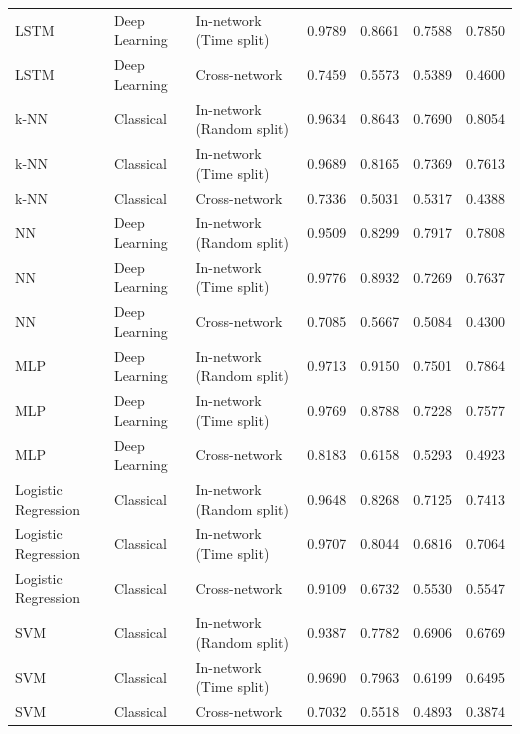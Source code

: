 \begin{table}
\begin{tabular}{lllrrrr}
LSTM & Deep Learning & In-network (Time split) & 0.9789 & 0.8661 & 0.7588 & 0.7850 \\
LSTM & Deep Learning & Cross-network & 0.7459 & 0.5573 & 0.5389 & 0.4600 \\
k-NN & Classical & In-network (Random split) & 0.9634 & 0.8643 & 0.7690 & 0.8054 \\
k-NN & Classical & In-network (Time split) & 0.9689 & 0.8165 & 0.7369 & 0.7613 \\
k-NN & Classical & Cross-network & 0.7336 & 0.5031 & 0.5317 & 0.4388 \\
NN & Deep Learning & In-network (Random split) & 0.9509 & 0.8299 & 0.7917 & 0.7808 \\
NN & Deep Learning & In-network (Time split) & 0.9776 & 0.8932 & 0.7269 & 0.7637 \\
NN & Deep Learning & Cross-network & 0.7085 & 0.5667 & 0.5084 & 0.4300 \\
MLP & Deep Learning & In-network (Random split) & 0.9713 & 0.9150 & 0.7501 & 0.7864 \\
MLP & Deep Learning & In-network (Time split) & 0.9769 & 0.8788 & 0.7228 & 0.7577 \\
MLP & Deep Learning & Cross-network & 0.8183 & 0.6158 & 0.5293 & 0.4923 \\
Logistic Regression & Classical & In-network (Random split) & 0.9648 & 0.8268 & 0.7125 & 0.7413 \\
Logistic Regression & Classical & In-network (Time split) & 0.9707 & 0.8044 & 0.6816 & 0.7064 \\
Logistic Regression & Classical & Cross-network & 0.9109 & 0.6732 & 0.5530 & 0.5547 \\
SVM & Classical & In-network (Random split) & 0.9387 & 0.7782 & 0.6906 & 0.6769 \\
SVM & Classical & In-network (Time split) & 0.9690 & 0.7963 & 0.6199 & 0.6495 \\
SVM & Classical & Cross-network & 0.7032 & 0.5518 & 0.4893 & 0.3874 \\
\bottomrule
\end{tabular}
\end{table}
